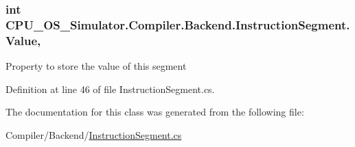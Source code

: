 \subsubsection[{Value}]{\setlength{\rightskip}{0pt plus 5cm}int C\+P\+U\+\_\+\+O\+S\+\_\+\+Simulator.\+Compiler.\+Backend.\+Instruction\+Segment.\+Value\hspace{0.3cm}{\ttfamily [get]}, {\ttfamily [set]}}\label{class_c_p_u___o_s___simulator_1_1_compiler_1_1_backend_1_1_instruction_segment_af22d3fe5ffbacd4b521a5638977feaa2}


Property to store the value of this segment 



Definition at line 46 of file Instruction\+Segment.\+cs.



The documentation for this class was generated from the following file\+:\begin{DoxyCompactItemize}
\item 
Compiler/\+Backend/\hyperlink{_instruction_segment_8cs}{Instruction\+Segment.\+cs}\end{DoxyCompactItemize}
